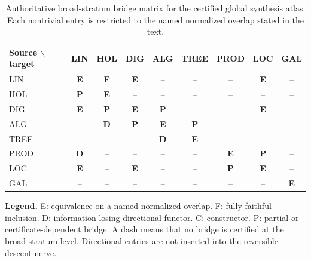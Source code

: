 \begin{landscape}
\begin{table}[p]
\centering
\caption{Authoritative broad-stratum bridge matrix for the certified global synthesis atlas. Each nontrivial entry is restricted to the named normalized overlap stated in the text.}
\label{tab:block13-bridge-matrix}
\scriptsize
\setlength{\tabcolsep}{4pt}
\begin{tabular}{@{}lcccccccc@{}}
\toprule
Source $\backslash$ target & LIN & HOL & DIG & ALG & TREE & PROD & LOC & GAL\\
\midrule
LIN & \textbf{E} & \textbf{F} & \textbf{E} & -- & -- & -- & \textbf{E} & --\\
HOL & \textbf{P} & \textbf{E} & -- & -- & -- & -- & -- & --\\
DIG & \textbf{E} & \textbf{P} & \textbf{E} & \textbf{P} & -- & -- & \textbf{E} & --\\
ALG & -- & \textbf{D} & \textbf{P} & \textbf{E} & \textbf{P} & -- & -- & --\\
TREE & -- & -- & -- & \textbf{D} & \textbf{E} & -- & -- & --\\
PROD & \textbf{D} & -- & -- & -- & -- & \textbf{E} & \textbf{P} & --\\
LOC & \textbf{E} & -- & \textbf{E} & -- & -- & \textbf{P} & \textbf{E} & --\\
GAL & -- & -- & -- & -- & -- & -- & -- & \textbf{E}\\
\bottomrule
\end{tabular}
\vspace{5pt}
\parbox{0.93\linewidth}{\scriptsize \textbf{Legend.} E: equivalence on a named normalized overlap. F: fully faithful inclusion. D: information-losing directional functor. C: constructor. P: partial or certificate-dependent bridge. A dash means that no bridge is certified at the broad-stratum level. Directional entries are not inserted into the reversible descent nerve.}
\end{table}
\end{landscape}

